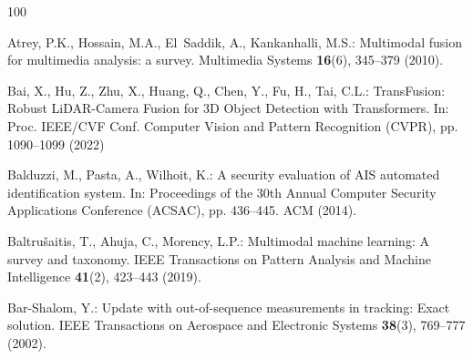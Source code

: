 \documentclass[graybox,envcountchap]{style/SNmono}
\begin{document}
\begin{thebibliography}{100}
{\par}

Atrey, P.K., Hossain, M.A., El~Saddik, A., Kankanhalli, M.S.: Multimodal fusion
  for multimedia analysis: a survey.
\newblock Multimedia Systems \textbf{16}(6), 345--379 (2010).
\newblock {}


{\color{red} 
Bai, X., Hu, Z., Zhu, X., Huang, Q., Chen, Y., Fu, H., Tai, C.L.: {TransFusion:
  Robust LiDAR-Camera Fusion for 3D Object Detection with Transformers}.
\newblock In: Proc. IEEE/CVF Conf. Computer Vision and Pattern Recognition
  (CVPR), pp. 1090--1099 (2022)

\par}

Balduzzi, M., Pasta, A., Wilhoit, K.: A security evaluation of {AIS} automated
  identification system.
\newblock In: Proceedings of the 30th Annual Computer Security Applications
  Conference (ACSAC), pp. 436--445. ACM (2014).
\newblock {}



Baltru{\v{s}}aitis, T., Ahuja, C., Morency, L.P.: Multimodal machine learning:
  A survey and taxonomy.
\newblock IEEE Transactions on Pattern Analysis and Machine Intelligence
  \textbf{41}(2), 423--443 (2019).
\newblock {}


{\color{red} 
Bar-Shalom, Y.: Update with out-of-sequence measurements in tracking: Exact
  solution.
\newblock IEEE Transactions on Aerospace and Electronic Systems \textbf{38}(3),
  769--777 (2002).
\newblock {}

\par}
\end{thebibliography}
\end{document}
